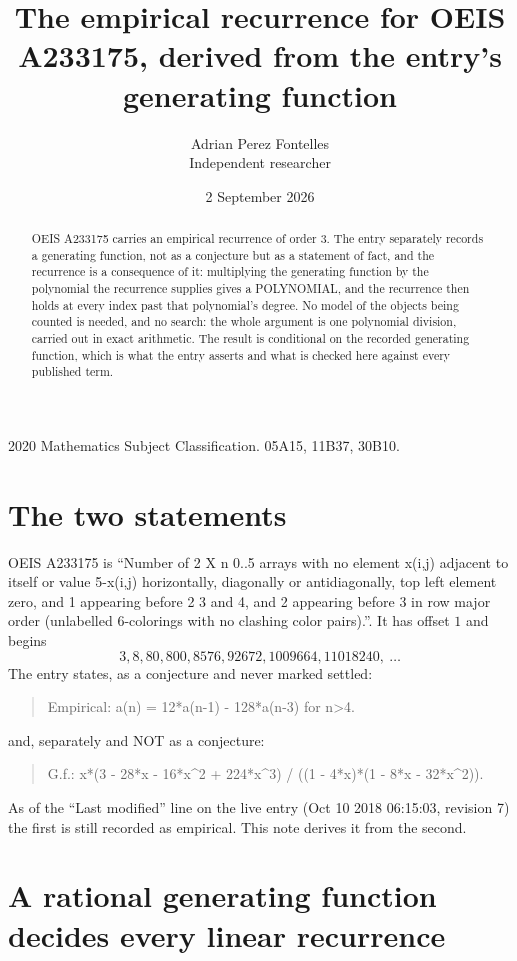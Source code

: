 \documentclass[11pt,a4paper]{article}
\title{The empirical recurrence for OEIS A233175, derived from the entry's generating function}
\author{Adrian Perez Fontelles\\ \small Independent researcher}
\date{2 September 2026}
\theoremstyle{plain}
\theoremstyle{definition}
\begin{document}
\maketitle

\begin{abstract}
OEIS A233175 carries an empirical recurrence of order $3$. The entry separately records a
generating function, not as a conjecture but as a statement of fact, and the recurrence is a
consequence of it: multiplying the generating function by the polynomial the recurrence
supplies gives a POLYNOMIAL, and the recurrence then holds at every index past that
polynomial's degree. No model of the objects being counted is needed, and no search: the
whole argument is one polynomial division, carried out in exact arithmetic. The result is
conditional on the recorded generating function, which is what the entry asserts and what is
checked here against every published term.
\end{abstract}

\noindent\small 2020 Mathematics Subject Classification. 05A15, 11B37, 30B10.\normalsize

\section{The two statements}

OEIS A233175 is ``Number of 2 X n 0..5 arrays with no element x(i,j) adjacent to itself or value 5-x(i,j) horizontally, diagonally or antidiagonally, top left element zero, and 1 appearing before 2 3 and 4, and 2 appearing before 3 in row major order (unlabelled 6-colorings with no clashing color pairs).''. It has offset $1$ and begins
\[
3, 8, 80, 800, 8576, 92672, 1009664, 11018240,\ \dots
\]
The entry states, as a conjecture and never marked settled:
\begin{quote}
Empirical: a(n) = 12*a(n-1) - 128*a(n-3) for n>4.
\end{quote}
and, separately and NOT as a conjecture:
\begin{quote}
G.f.: x*(3 - 28*x - 16*x\^{}2 + 224*x\^{}3) / ((1 - 4*x)*(1 - 8*x - 32*x\^{}2)).
\end{quote}
As of the ``Last modified'' line on the live entry (Oct 10 2018 06:15:03, revision 7) the first is still
recorded as empirical. This note derives it from the second.

\section{A rational generating function decides every linear recurrence}
\end{document}
